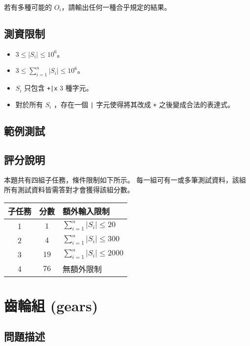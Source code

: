 若有多種可能的 \(O_i\)，請輸出任何一種合乎規定的結果。

\subsection{測資限制}

\begin{itemize}
\tightlist
\item
  \(3 \le |S_i| \le 10^6\)。
\item
  \(3 \le \sum_{i=1}^n|S_i| \le 10^6\)。
\item
  \(S_i\) 只包含 \texttt{+|x} \(3\) 種字元。
\item
  對於所有 \(S_i\) ，存在一個 \texttt{|} 字元使得將其改成 \texttt{+}
  之後變成合法的表達式。
\end{itemize}

\subsection{範例測試}

\begin{example}
%
\end{example}

\subsection{評分說明}

本題共有四組子任務，條件限制如下所示。
每一組可有一或多筆測試資料，該組所有測試資料皆需答對才會獲得該組分數。

\begin{longtable}[]{@{}ccl@{}}
\toprule
子任務 & 分數 & 額外輸入限制 \\
\midrule
\endhead
1 & \(1\) & \(\sum_{i=1}^n|S_i| \le 20\) \\
2 & \(4\) & \(\sum_{i=1}^n|S_i| \le 300\) \\
3 & \(19\) & \(\sum_{i=1}^n|S_i| \le 2000\) \\
4 & \(76\) & 無額外限制 \\
\bottomrule
\end{longtable}

\section{齒輪組 (gears)}

\subsection{問題描述}

